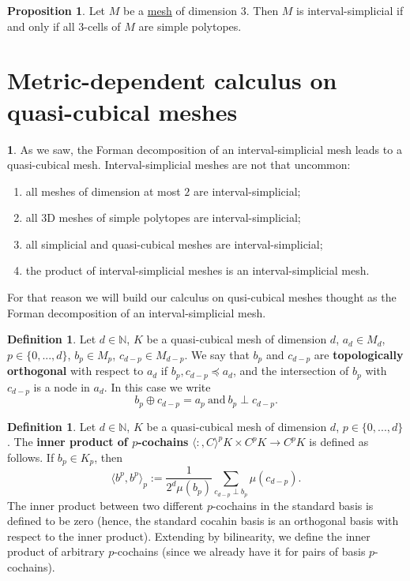 \documentclass[fleqn]{article}
\theoremstyle{definition}
\newtheorem{proposition}[theorem]{Proposition}
\newtheorem{definition}[theorem]{Definition}
\newtheorem{discussion}[theorem]{}
\newcommand{\N}{\mathbb{N}}
\newcommand{\inner}[2]{\langle#1,#2\rangle}
\begin{document}
\begin{proposition}
  Let $M$ be a \hyperref[idec:mesh:definition]{mesh} of dimension $3$.
  Then $M$ is interval-simplicial if and only if all $3$-cells of $M$
  are simple polytopes.
\end{proposition}

\section{Metric-dependent calculus on quasi-cubical meshes}

\begin{discussion}
  As we saw, the Forman decomposition of an interval-simplicial mesh leads to a
  quasi-cubical mesh.
  Interval-simplicial meshes are not that uncommon:
  \begin{enumerate}
    \item
      all meshes of dimension at most $2$ are interval-simplicial;
    \item
      all $3$D meshes of simple polytopes are interval-simplicial;
    \item
      all simplicial and quasi-cubical meshes are interval-simplicial;
    \item
      the product of interval-simplicial meshes is an interval-simplicial mesh.
  \end{enumerate}
  For that reason we will build our calculus on qusi-cubical meshes thought as
  the Forman decomposition of an interval-simplicial mesh.
\end{discussion}

\begin{definition}
  Let
    $d \in \N$,
    $K$ be a quasi-cubical mesh of dimension $d$,
    $a_d \in M_d$,
    $p \in \{0, ..., d\}$,
    $b_p \in M_p$,
    $c_{d - p} \in M_{d - p}$.
  We say that $b_p$ and $c_{d - p}$ are \textbf{topologically orthogonal}
  with respect to $a_d$ if $b_p, c_{d - p} \preceq a_d$, and the intersection of
  $b_p$ with $c_{d - p}$ is a node in $a_d$.
  In this case we write
  \begin{equation}
    b_p \oplus c_{d - p} = a_p\
    \text{and}\
    b_p \perp c_{d - p}.
  \end{equation}
\end{definition}

\begin{definition}
  Let
    $d \in \N$,
    $K$ be a quasi-cubical mesh of dimension $d$,
    $p \in \{0, ..., d\}$.
  The \textbf{inner product of $p$-cochains}
  $\inner \colon C^p K \times C^p K \to C^p K$
  is defined as follows.
  If $b_p \in K_p$, then
  \begin{equation}
    \inner{b^p}{b^p}_p :=
    \frac{1}{2^d \mu(b_p)} \sum_{c_{d - p} \perp b_p} \mu(c_{d - p}).
  \end{equation}
  The inner product between two different $p$-cochains in the standard basis is
  defined to be zero
  (hence, the standard cocahin basis is an orthogonal basis with respect to the
  inner product).
  Extending by bilinearity, we define the inner product of arbitrary
  $p$-cochains (since we already have it for pairs of basis $p$-cochains).
\end{definition}
\end{document}
